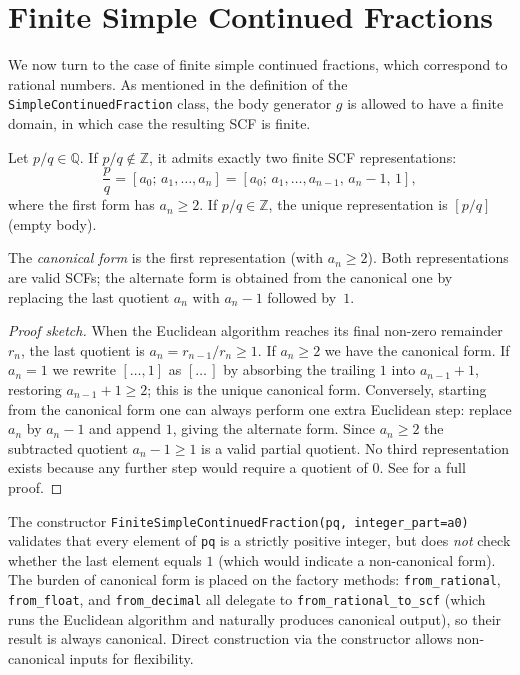 \section{Finite Simple Continued Fractions}
\label{sec:finite_scf}
We now turn to the case of finite simple continued fractions, which correspond to rational numbers.
As mentioned in the definition of the \texttt{SimpleContinuedFraction} class, the body generator
$g$ is allowed to have a finite domain, in which case the resulting SCF is finite.

\begin{proposition}
  Let $p/q \in \mathbb{Q}$.  If $p/q \notin \mathbb{Z}$, it admits exactly two finite SCF
  representations:
  \[
    \frac{p}{q} = [a_0;\, a_1, \ldots, a_n]
               = [a_0;\, a_1, \ldots, a_{n-1},\, a_n - 1,\, 1],
  \]
  where the first form has $a_n \geq 2$.  If $p/q \in \mathbb{Z}$, the unique representation
  is $[p/q]$ (empty body).

  The \emph{canonical form} is the first representation (with $a_n \geq 2$).  Both
  representations are valid SCFs; the alternate form is obtained from the canonical one
  by replacing the last quotient $a_n$ with $a_n - 1$ followed by~$1$.
\end{proposition}

\begin{proof}[Proof sketch]
  When the Euclidean algorithm reaches its final non-zero remainder $r_n$, the last
  quotient is $a_n = r_{n-1} / r_n \geq 1$.  If $a_n \geq 2$ we have the canonical
  form.  If $a_n = 1$ we rewrite $[\ldots, 1]$ as $[\ldots\,]$ by absorbing the
  trailing $1$ into $a_{n-1}+1$, restoring $a_{n-1}+1 \geq 2$; this is the unique
  canonical form.  Conversely, starting from the canonical form one can always perform
  one extra Euclidean step: replace $a_n$ by $a_n - 1$ and append $1$, giving the
  alternate form.  Since $a_n \geq 2$ the subtracted quotient $a_n - 1 \geq 1$ is a
  valid partial quotient.  No third representation exists because any further step
  would require a quotient of $0$.  See \cite{khinchin1964} for a full proof.
\end{proof}

\begin{remark}
  The constructor \texttt{FiniteSimpleContinuedFraction(pq, integer\_part=a0)}
  validates that every element of \texttt{pq} is a strictly positive integer, but does
  \emph{not} check whether the last element equals $1$ (which would indicate a non-canonical
  form).  The burden of canonical form is placed on the factory methods:
  \texttt{from\_rational}, \texttt{from\_float}, and \texttt{from\_decimal} all delegate to
  \texttt{from\_rational\_to\_scf} (which runs the Euclidean algorithm and naturally produces
  canonical output), so their result is always canonical.  Direct construction via the
  constructor allows non-canonical inputs for flexibility.
\end{remark}

